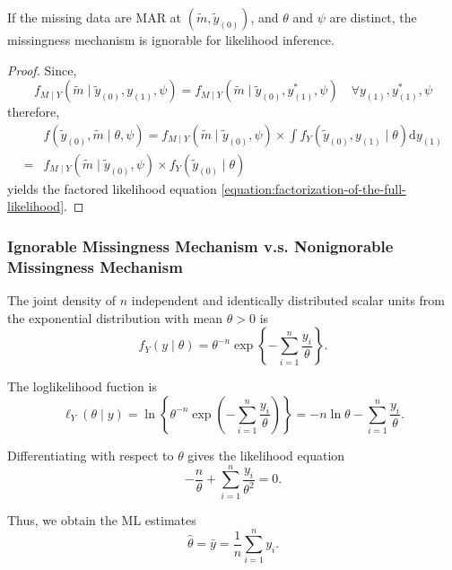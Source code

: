 \begin{corollary}
    If the missing data are MAR at $\left(\tilde{m}, \tilde{y}_{(0)}\right)$, and $\theta$ and $\psi$ are distinct, the missingness mechanism is ignorable for likelihood inference.
\end{corollary}

\begin{proof}
    Since,
    \begin{equation}
        f_{M \mid Y}\left(\tilde{m} \mid \tilde{y}_{(0)}, y_{(1)}, \psi\right)=f_{M \mid Y}\left(\tilde{m} \mid \tilde{y}_{(0)}, y_{(1)}^{*}, \psi\right) \quad \forall y_{(1)}, y_{(1)}^{*}, \psi
    \end{equation}
    therefore,
    \begin{equation}
        \begin{aligned}
              & f\left(\tilde{y}_{(0)}, \tilde{m} \mid \theta, \psi\right)=f_{M \mid Y}\left(\tilde{m} \mid \tilde{y}_{(0)}, \psi\right) \times \int f_{Y}\left(\tilde{y}_{(0)}, y_{(1)} \mid \theta\right) \mathrm{d} y_{(1)} \\
            = & f_{M \mid Y}\left(\tilde{m} \mid \tilde{y}_{(0)}, \psi\right) \times f_{Y}\left(\tilde{y}_{(0)} \mid \theta\right)
        \end{aligned}
    \end{equation}
    yields the factored likelihood equation \ref{equation:factorization-of-the-full-likelihood}.
\end{proof}

\subsubsection{Ignorable Missingness Mechanism v.s. Nonignorable Missingness Mechanism}

\begin{example}
    The joint density of $n$ independent and identically distributed scalar units from the exponential distribution with mean $\theta>0$ is
    \begin{equation}
        f_{Y}(y\mid\theta)=\theta^{-n}\exp\left\{-\sum_{i=1}^{n}\frac{y_{i}}{\theta}\right\}.
    \end{equation}

    The loglikelihood fuction is
    \begin{equation}
        \ell_{Y}(\theta\mid y)=\ln\left\{\theta^{-n}\exp\left(-\sum_{i=1}^{n}\frac{y_{i}}{\theta}\right)\right\}=-n\ln\theta-\sum_{i=1}^{n}\frac{y_{i}}{\theta}.
    \end{equation}

    Differentiating with respect to $\theta$ gives the likelihood equation
    \begin{equation}
        -\frac{n}{\theta}+\sum_{i=1}^{n} \frac{y_{i}}{\theta^{2}}=0.
    \end{equation}

    Thus, we obtain the ML estimates
    \begin{equation}
        \hat{\theta}=\bar{y}=\frac{1}{n}\sum_{i=1}^{n}y_i.
    \end{equation}
\end{example}

